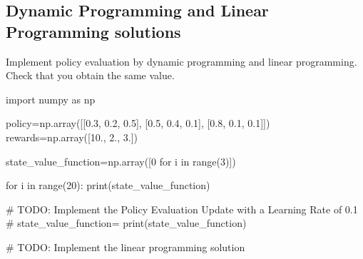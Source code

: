 \subsection{Dynamic Programming and Linear Programming solutions}

\begin{exercise}
\label{exercise:PolicyEvaluation}
Implement policy evaluation by dynamic programming and linear programming. Check that you obtain the same value.

\begin{python}
import numpy as np

policy=np.array([[0.3, 0.2, 0.5], [0.5, 0.4, 0.1], [0.8, 0.1, 0.1]])
rewards=np.array([10., 2., 3.])

state_value_function=np.array([0 for i in range(3)])

for i in range(20):
    print(state_value_function)

    # TODO: Implement the Policy Evaluation Update with a Learning Rate of 0.1
    # state_value_function=
print(state_value_function)

# TODO: Implement the linear programming solution
\end{python}
\end{exercise}

